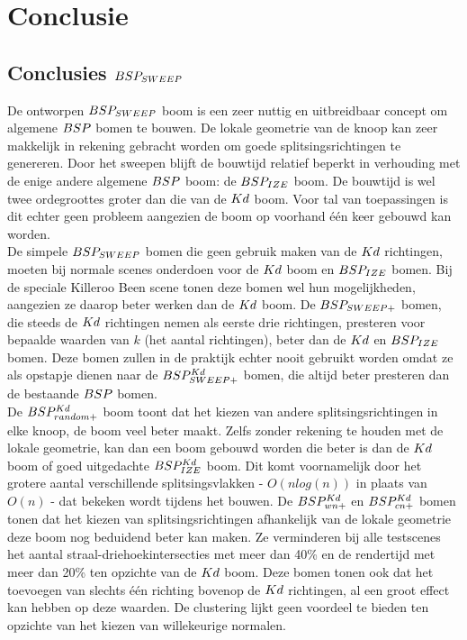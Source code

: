 \chapter{Conclusie}
\label{hoofdstuk:conclusie}

\section{Conclusies $BSP_{SWEEP}$}
De ontworpen $BSP_{SWEEP}$ boom is een zeer nuttig en uitbreidbaar concept om algemene $BSP$ bomen te bouwen.
De lokale geometrie van de knoop kan zeer makkelijk in rekening gebracht worden om goede splitsingsrichtingen te genereren.
Door het sweepen blijft de bouwtijd relatief beperkt in verhouding met de enige andere algemene $BSP$ boom: de $BSP_{IZE}$ boom.
De bouwtijd is wel twee ordegroottes groter dan die van de $Kd$ boom.
Voor tal van toepassingen is dit echter geen probleem aangezien de boom op voorhand één keer gebouwd kan worden.\\

De simpele $BSP_{SWEEP}$ bomen die geen gebruik maken van de $Kd$ richtingen, moeten bij normale scenes onderdoen voor de $Kd$ boom en $BSP_{IZE}$ bomen.
Bij de speciale Killeroo Been scene tonen deze bomen wel hun mogelijkheden, aangezien ze daarop beter werken dan de $Kd$ boom.
De $BSP_{SWEEP+}$ bomen, die steeds de $Kd$ richtingen nemen als eerste drie richtingen, presteren voor bepaalde waarden van $k$ (het aantal richtingen), beter dan de $Kd$ en $BSP_{IZE}$ bomen.
Deze bomen zullen in de praktijk echter nooit gebruikt worden omdat ze als opstapje dienen naar de $BSP^{Kd}_{SWEEP+}$ bomen, die altijd beter presteren dan de bestaande $BSP$ bomen.\\

De $BSP^{Kd}_{random+}$ boom toont dat het kiezen van andere splitsingsrichtingen in elke knoop, de boom veel beter maakt. 
Zelfs zonder rekening te houden met de lokale geometrie, kan dan een boom gebouwd worden die beter is dan de $Kd$ boom of goed uitgedachte $BSP^{Kd}_{IZE}$ boom. 
Dit komt voornamelijk door het grotere aantal verschillende splitsingsvlakken - $O(nlog(n))$ in plaats van $O(n)$ - dat bekeken wordt tijdens het bouwen.
De $BSP^{Kd}_{wn+}$ en $BSP^{Kd}_{cn+}$ bomen tonen dat het kiezen van splitsingsrichtingen afhankelijk van de lokale geometrie deze boom nog beduidend beter kan maken.
Ze verminderen bij alle testscenes het aantal straal-driehoekintersecties met meer dan 40\% en de rendertijd met meer dan 20\% ten opzichte van de $Kd$ boom.
Deze bomen tonen ook dat het toevoegen van slechts één richting bovenop de $Kd$ richtingen, al een groot effect kan hebben op deze waarden.
De clustering lijkt geen voordeel te bieden ten opzichte van het kiezen van willekeurige normalen.

